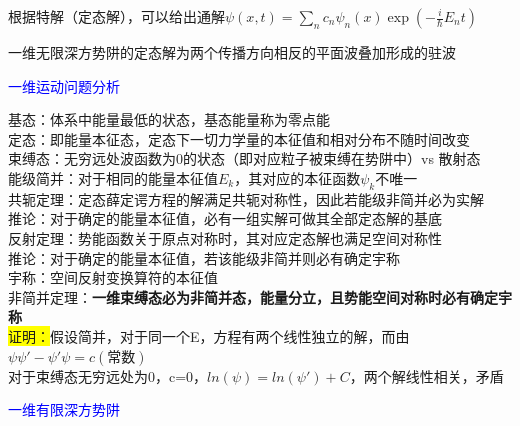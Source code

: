 \documentclass[a4paper,8pt]{extarticle} %
\newcommand{\bluetext}[1]{\textcolor{blue}{#1}}
\newcommand{\yellowback}[1]{\colorbox{yellow}{#1}}
\newcommand{\black}[1]{\textbf{#1}}
\begin{document}
\begin{multicols}{3}
根据特解（定态解），可以给出通解$\psi(x,t) = \sum_n c_n\psi_n(x)\exp(-\frac{i}{\hbar}E_nt)$ \hspace{2em} 

一维无限深方势阱的定态解为两个传播方向相反的平面波叠加形成的驻波

\bluetext{一维运动问题分析}

基态：体系中能量最低的状态，基态能量称为零点能\\
定态：即能量本征态，定态下一切力学量的本征值和相对分布不随时间改变\\
束缚态：无穷远处波函数为0的状态（即对应粒子被束缚在势阱中）vs 散射态\\
能级简并：对于相同的能量本征值$E_k$，其对应的本征函数$\psi_k$不唯一\\
共轭定理：定态薛定谔方程的解满足共轭对称性，因此若能级非简并必为实解\\
推论：对于确定的能量本征值，必有一组实解可做其全部定态解的基底\\
反射定理：势能函数关于原点对称时，其对应定态解也满足空间对称性\\
推论：对于确定的能量本征值，若该能级非简并则必有确定宇称\\
宇称：空间反射变换算符的本征值\\
非简并定理：\black{一维束缚态必为非简并态，能量分立，且势能空间对称时必有确定宇称}\\
\yellowback{证明：}假设简并，对于同一个E，方程有两个线性独立的解，而由$\psi\psi'-\psi'\psi=c(常数)$\\
对于束缚态无穷远处为0，c=0，$ln(\psi)=ln(\psi')+C$，两个解线性相关，矛盾

\bluetext{一维有限深方势阱}


\end{multicols}
\end{document}
